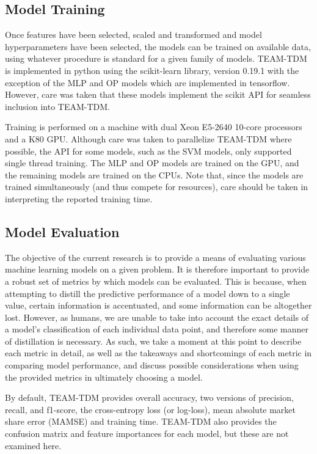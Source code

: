 \documentclass[conference]{IEEEtran}
\begin{document}
\subsection{Model Training} \label{subsection:training}

Once features have been selected, scaled and transformed and model hyperparameters have been selected, the models can be trained on available data, using whatever procedure is standard for a given family of models.
 TEAM-TDM is implemented in python using the scikit-learn library, version 0.19.1 \cite{scikit-learn} with the exception of the MLP and OP models which are implemented in tensorflow.
 However, care was taken that these models implement the scikit API for seamless inclusion into TEAM-TDM.

Training is performed on a machine with dual Xeon E5-2640 10-core processors and a K80 GPU.
 Although care was taken to parallelize TEAM-TDM where possible, the API for some models, such as the SVM models, only supported single thread training.
 The MLP and OP models are trained on the GPU, and the remaining models are trained on the CPUs.
 Note that, since the models are trained simultaneously (and thus compete for resources), care should be taken in interpreting the reported training time.

\subsection{Model Evaluation} \label{subsection:evaluation}

The objective of the current research is to provide a means of evaluating various machine learning models on a given problem.
 It is therefore important to provide a robust set of metrics by which models can be evaluated.
 This is because, when attempting to distill the predictive performance of a model down to a single value, certain information is accentuated, and some information can be altogether lost.
 However, as humans, we are unable to take into account the exact details of a model's classification of each individual data point, and therefore some manner of distillation is necessary.
 As such, we take a moment at this point to describe each metric in detail, as well as the takeaways and shortcomings of each metric in comparing model performance, and discuss possible considerations when using the provided metrics in ultimately choosing a model.

By default, TEAM-TDM provides overall accuracy, two versions of precision, recall, and f1-score, the cross-entropy loss (or log-loss), mean absolute market share error (MAMSE) and training time.
 TEAM-TDM also provides the confusion matrix and feature importances for each model, but these are not examined here.
\end{document}
